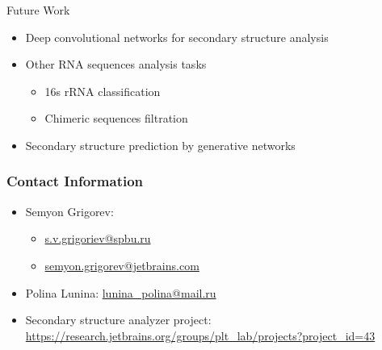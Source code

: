 \documentclass[xcolor=table]{beamer}
\begin{document}
\begin{frame}{Future Work}
\begin{itemize}
    \item Deep convolutional networks for secondary structure analysis
    \item Other RNA sequences analysis tasks
    \begin{itemize}
        \item 16s rRNA classification
        \item Chimeric sequences filtration
    \end{itemize}
    \item Secondary structure prediction by generative networks
\end{itemize}

\end{frame}

\begin{frame}
\frametitle{Contact Information}
\begin{itemize}
  \item Semyon Grigorev:
    \begin{itemize}
      \item \href{mailto:s.v.grigoriev@spbu.ru}{s.v.grigoriev@spbu.ru}
      \item \href{mailto:semyon.grigorev@jetbrains.com}{semyon.grigorev@jetbrains.com}
    \end{itemize}
  \item Polina Lunina: \href{mailto:lunina\_polina@mail.ru}{lunina\_polina@mail.ru}
  \item Secondary structure analyzer project: \href{https://research.jetbrains.org/groups/plt\_lab/projects?project\_id=43}{https://research.jetbrains.org/groups/plt\_lab/projects?project\_id=43}
\end{itemize}
\vspace{0.3cm}
\end{frame}
\end{document}
